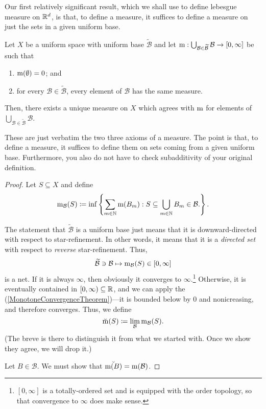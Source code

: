Our first relatively significant result, which we shall use to define lebesgue measure on $\mathbb{R} ^d$, is that, to define a measure, it suffices to define a measure on just the sets in a given uniform base.
\begin{prp}
Let $X$ be a uniform space with uniform base $\widetilde{\mathcal{B}}$ and let $\mathrm{m} :\bigcup _{\mathcal{B}\in \widetilde{\mathcal{B}}}\mathcal{B}\rightarrow [0,\infty ]$ be such that
\begin{enumerate}
\item $\mathrm{m} (\emptyset )=0$; and
\item for every $\mathcal{B}\in \widetilde{\mathcal{B}}$, every element of $\mathcal{B}$ has the same measure.
\end{enumerate}
Then, there exists a unique measure on $X$ which agrees with $\mathrm{m}$ for elements of $\bigcup _{\mathcal{B}\in \widetilde{\mathcal{B}}}\mathcal{B}$.
\begin{rmk}
These are just verbatim the two three axioms of a measure.  The point is that, to define a measure, it suffices to define them on sets coming from a given uniform base.  Furthermore, you also do not have to check subadditivity of your original definition.
\end{rmk}
\begin{proof}
Let $S\subseteq X$ and define
\begin{equation}
\mathrm{m} _{\mathcal{B}}(S)\coloneqq \inf \left\{ \sum _{m\in \mathbb{N}}\mathrm{m} (B_m):S\subseteq \bigcup _{m\in \mathbb{N}}B_m\in \mathcal{B}\text{.}\right\} .
\end{equation}

The statement that $\widetilde{\mathcal{B}}$ is a uniform base just means that it is downward-directed with respect to star-refinement.  In other words, it means that it is a \emph{directed set} with respect to \emph{reverse} star-refinement.  Thus,
\begin{equation}
\widetilde{\mathcal{B}}\ni \mathcal{B}\mapsto \mathrm{m} _{\mathcal{B}}(S)\in [0,\infty ]
\end{equation}
is a net.  If it is always $\infty$, then obviously it converges to $\infty$.\footnote{$[0,\infty ]$ is a totally-ordered set and is equipped with the order topology, so that convergence to $\infty$ does make sense.}  Otherwise, it is eventually contained in $[0,\infty )\subseteq \mathbb{R}$, and we can apply the  (\cref{MonotoneConvergenceTheorem})---it is bounded below by $0$ and nonicreasing, and therefore converges.  Thus, we define
\begin{equation}
\breve{\mathrm{m}}(S)\coloneqq \lim _{\mathcal{B}}\mathrm{m} _{\mathcal{B}}(S).
\end{equation}
(The breve is there to distinguish it from what we started with.  Once we show they agree, we will drop it.)

Let $B\in \mathcal{B}$.  We must show that $\breve{\mathrm{m} (B)}=\mathrm{m}(\mathcal{B})$.
\end{proof}
\end{prp}